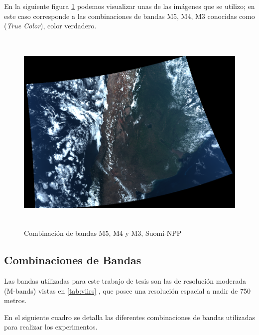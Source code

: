 En la siguiente figura \ref{Fig: bandas543} podemos visualizar unas de las imágenes que se utilizo; en este caso corresponde  a las combinaciones de bandas M5, M4, M3 conocidas como (\textit{True Color}), color verdadero.

\begin{figure}[H]
 \centering
  \includegraphics[height=10cm,keepaspectratio=true,clip=true]{imagenes/RecolecciondeDatos/img-543.png}
  \caption{Combinación de bandas M5, M4 y M3, Suomi-NPP}
	\label{Fig: bandas543}
\end{figure}


\subsection{Combinaciones de Bandas}\label{sub:comb_de_banda}

Las bandas  utilizadas para este trabajo de tesis  son las  de resolución moderada (M-bands) vistas en \ref{tab:viirs} , que posee una resolución espacial a nadir de 750 metros.

En el siguiente cuadro se detalla las diferentes combinaciones de bandas utilizadas para realizar los experimentos.

